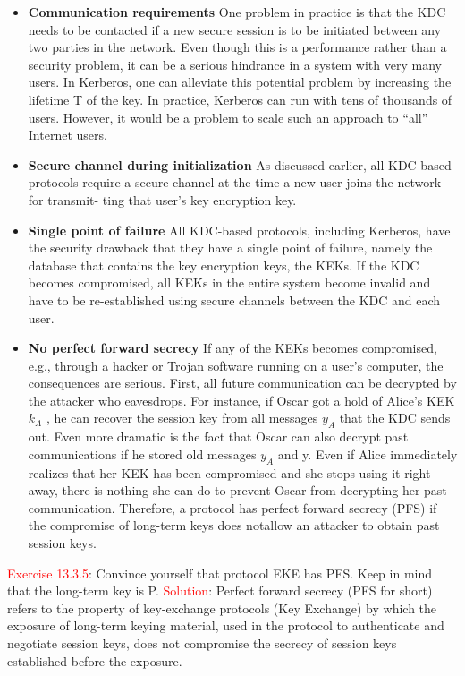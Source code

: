 \documentclass{article}
\begin{document}
\begin{itemize}
    \item \textbf{Communication requirements } One problem in practice is that the KDC needs to
be contacted if a new secure session is to be initiated between any two parties in the
network. Even though this is a performance rather than a security problem, it can be
a serious hindrance in a system with very many users. In Kerberos, one can alleviate
this potential problem by increasing the lifetime T of the key. In practice, Kerberos
can run with tens of thousands of users. However, it would be a problem to scale
such an approach to “all” Internet users.
\item \textbf{Secure channel during initialization}  As discussed earlier, all KDC-based protocols require a secure channel at the time a new user joins the network for transmit-
ting that user’s key encryption key.
\item \textbf{Single point of failure}  All KDC-based protocols, including Kerberos, have the
security drawback that they have a single point of failure, namely the database that
contains the key encryption keys, the KEKs. If the KDC becomes compromised,
all KEKs in the entire system become invalid and have to be re-established using
secure channels between the KDC and each user.
\item \textbf{No perfect forward secrecy}  If any of the KEKs becomes compromised, e.g.,
through a hacker or Trojan software running on a user’s computer, the consequences
are serious. First, all future communication can be decrypted by the attacker who
eavesdrops. For instance, if Oscar got a hold of Alice’s KEK $k_A$ , he can recover the
session key from all messages $y_A$ that the KDC sends out. Even more dramatic
is the fact that Oscar can also decrypt past communications if he stored old
messages $y_A$ and y. Even if Alice immediately realizes that her KEK has been compromised and she stops using it right away, there is nothing she can do to prevent
Oscar from decrypting her past communication.
Therefore, a protocol has perfect forward secrecy (PFS) if the compromise of long-term keys does notallow an attacker to obtain past session keys.
\end{itemize}
\newline\newline \textcolor{red}{Exercise 13.3.5}: Convince yourself that protocol EKE has PFS. Keep in mind that the long-term key is P.
\newline \textcolor{red}{Solution}:
Perfect forward secrecy (PFS for short) refers to the property of key-exchange protocols (Key Exchange) by which the exposure of long-term keying material, used in the protocol to authenticate and negotiate session keys, does not compromise the secrecy of session keys established before the exposure.
\end{document}
